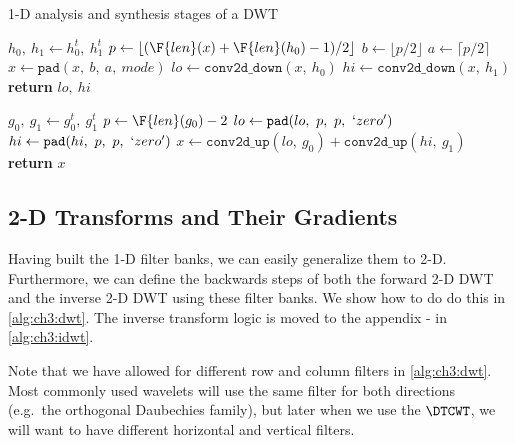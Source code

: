 \begin{algorithm}[tb]
\caption{1-D analysis and synthesis stages of a DWT}\label{alg:ch3:fb1d}
\begin{algorithmic}[1]
    \State $h_0,\ h_1 \gets h_0^t,\ h_1^t$  
  \EndIf
  \State $p \gets \lfloor (\F{len}(x) + \F{len}(h_0) - 1) / 2 \rfloor$ 
  \State $b \gets \lfloor p/2 \rfloor$ 
  \State $a \gets \lceil p/2 \rceil$ 
  \State $x \gets \mathtt{pad}(x,\ b,\ a,\ mode)$ 
  \State $lo \gets \mathtt{conv2d\_down} (x,\ h_0)$
  \State $hi \gets \mathtt{conv2d\_down} (x,\ h_1)$
  \State \textbf{return} $lo,\ hi$
\EndFunction
\end{algorithmic}\vspace{10pt}
\begin{algorithmic}[1]
    \State $g_0,\ g_1 \gets g_0^t,\ g_1^t$  
  \EndIf
  \State $p \gets \F{len}(g_0) - 2$ 
  \State $lo \gets \mathtt{pad}(lo,\ p,\ p,\ `zero')$ 
  \State $hi \gets \mathtt{pad}(hi,\ p,\ p,\ `zero')$ 
  \State $x \gets \mathtt{conv2d\_up}(lo,\ g_0) + \mathtt{conv2d\_up}(hi,\ g_1)$
  \State \textbf{return} $x$
\EndFunction
\end{algorithmic}
\end{algorithm}

\subsection{2-D Transforms and Their Gradients}
Having built the 1-D filter banks, we can easily generalize them to 2-D.
Furthermore, we can define the backwards steps of both the forward 2-D DWT
and the inverse 2-D DWT using these filter banks. We show how to do do this in
\autoref{alg:ch3:dwt}. The inverse transform logic is moved to the appendix - in
\autoref{alg:ch3:idwt}.

Note that we have allowed for different row and column
filters in \autoref{alg:ch3:dwt}. Most commonly used wavelets will use the same
filter for both directions (e.g.\ the orthogonal Daubechies family), but later
when we use the $\DTCWT$, we will want to have different horizontal and vertical
filters.

